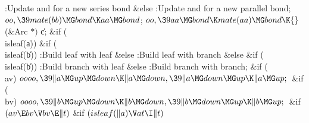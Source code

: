 :Update  and  for a new series bond\X\2\6
\&{else}\1\5
:Update  and  for a new parallel bond\X;\2\6
${}\\{oo},\39\\{mate}(\\{bb})\MG\\{bond}\K\\{aa}\MG\\{bond}{}$;\6
${}\\{oo},\39\\{aa}\MG\\{bond}\K\\{mate}(\\{aa})\MG\\{bond}\K{}$(\&{Arc}
${}{*}){}$ \|c;\6
\&{if} (\\{isleaf}(\|a))\1\6
\&{if} (\\{isleaf}(\|b))\1\5
:Build leaf with leaf\X\2\6
\&{else}\1\5
:Build leaf with branch\X\2\2\6
\&{else} \&{if} (\\{isleaf}(\|b))\1\5
:Build branch with leaf\X\2\6
\&{else}\1\5
:Build branch with branch\X;\2\6
\&{if} (\\{av})\1\5
${}\\{oooo},\39\|a\MG\\{up}\MG\\{down}\K\|a\MG\\{down},\39\|a\MG\\{down}\MG%
\\{up}\K\|a\MG\\{up};{}$\2\6
\&{if} (\\{bv})\1\5
${}\\{oooo},\39\|b\MG\\{up}\MG\\{down}\K\|b\MG\\{down},\39\|b\MG\\{down}\MG%
\\{up}\K\|b\MG\\{up};{}$\2\6
\&{if} ${}(\\{av}\E\\{bv}\V\\{bv}\E\|t){}$\1\6
\&{if} ${}(\\{isleaf}(\|a)\V\\{at}\I\|t){}$\1\5
